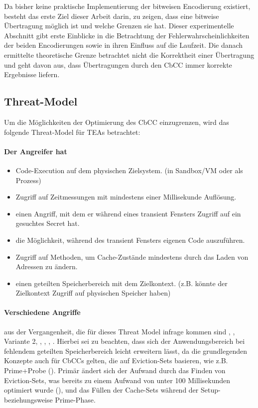 
Da bisher keine praktische Implementierung der bitweisen
Encodierung existiert, besteht das erste Ziel dieser Arbeit
darin, zu zeigen, dass eine bitweise Übertragung möglich
ist und welche Grenzen sie hat. Dieser experimentelle
Abschnitt gibt erste Einblicke in die
Betrachtung der Fehlerwahrscheinlichkeiten der beiden
Encodierungen sowie in ihren Einfluss auf die Laufzeit.
Die danach ermittelte
theoretische Grenze betrachtet nicht die Korrektheit
einer Übertragung und geht davon aus, dass Übertragungen
durch den \ac{CbCC} immer korrekte Ergebnisse liefern.

\subsection{Threat-Model}
Um die Möglichkeiten der Optimierung des \ac{CbCC}
einzugrenzen, wird das fol\-gende Threat-Model für
\acp{TEA} betrachtet:

\paragraph{Der Angreifer hat}
\begin{itemize}
    \item Code-Execution auf dem
    physischen Zielsystem. (in Sandbox/VM oder als Prozess)
    \item Zugriff auf Zeitmessungen mit
    mindestens einer Millisekunde Auflösung.
    \item einen Angriff, mit dem er während eines transient
    Fensters Zugriff auf ein gesuchtes Secret hat.
    \item die Möglichkeit, während des transient Fensters eigenen
    Code auszuführen.
    \item Zugriff auf Methoden, um Cache-Zustände mindestens durch
    das Laden von Adressen zu ändern.
    \item einen geteilten Speicherbereich mit dem Zielkontext.
    (z.B. könnte der Zielkontext Zugriff auf physischen Speicher haben)
\end{itemize}

\paragraph{Verschiedene  Angriffe} aus der Vergangenheit,
die für dieses Threat Model infrage kommen sind
\cite{lipp_meltdown_2020}, \cite{maisuradze_ret2spec_2018},
\cite{schwarz_zombieload_2019} Variante 2,
\cite{kim_slap_2025}, \cite{kim_flop_2025},
\cite{kim_ileakage_2023}, \cite{hertogh_rain_nodate}.
Hierbei sei zu beachten, dass sich der Anwendungsbereich bei
fehlendem geteilten Speicherbereich leicht erweitern lässt,
da die grundlegenden Konzepte auch für \acp{CbCC} gelten,
die auf Eviction-Sets basieren, wie z.B. Prime+Probe
(\cite{liu_last-level_2015}). Primär ändert sich der Aufwand
durch das Finden von Eviction-Sets, was bereits zu einem
Aufwand von unter 100 Millisekunden optimiert wurde (\cite[3768]{kessous_pruneplumtree_2024}),
und das Füllen der Cache-Sets während der Setup-
beziehungsweise Prime-Phase.
